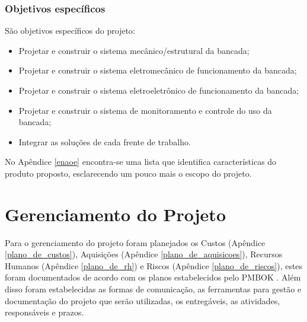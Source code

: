    \subsection{Objetivos específicos}
       São objetivos específicos do projeto:
       \begin{itemize}

        \item Projetar e construir o sistema mecânico/estrutural da bancada;
        \item Projetar e construir o sistema eletromecânico de funcionamento da bancada;
        \item Projetar e construir o sistema eletroeletrônico de funcionamento da bancada;
        \item Projetar e construir o sistema de monitoramento e controle do uso da bancada;
        \item Integrar as soluções de cada frente de trabalho.
       \end{itemize}

       No Apêndice \ref{enaoe} encontra-se uma lista que identifica características do produto proposto, esclarecendo um pouco mais o escopo do projeto.

% 

\chapter{Gerenciamento do Projeto}

Para o gerenciamento do projeto foram planejados os Custos (Apêndice \ref{plano_de_custos}), Aquisições (Apêndice \ref{plano_de_aquisicoes}), Recursos Humanos (Apêndice \ref{plano_de_rh}) e Riscos (Apêndice \ref{plano_de_riscos}), estes foram documentados de acordo com os planos estabelecidos pelo PMBOK \cite{pmbok}.
Além disso foram estabelecidas as formas de comunicação, as ferramentas para gestão e documentação do projeto que serão utilizadas, os entregáveis, as atividades, responsáveis e prazos.

